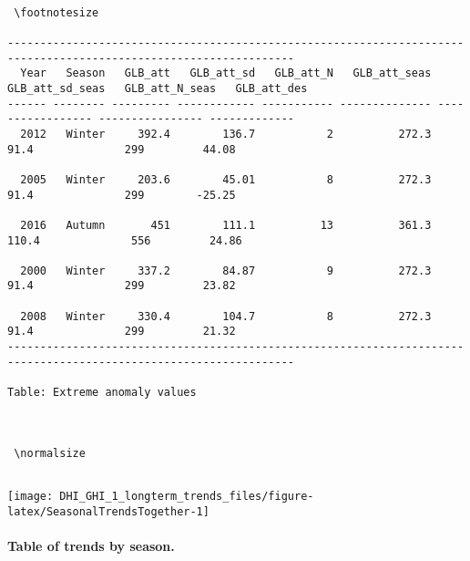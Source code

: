 \documentclass[
  10pt,
  a4paper,oneside]{article}
\begin{document}
\begin{verbatim}
 
 \footnotesize 
 
------------------------------------------------------------------------------------------------------------------
  Year   Season   GLB_att   GLB_att_sd   GLB_att_N   GLB_att_seas   GLB_att_sd_seas   GLB_att_N_seas   GLB_att_des
------ -------- --------- ------------ ----------- -------------- ----------------- ---------------- -------------
  2012   Winter     392.4        136.7           2          272.3              91.4              299         44.08

  2005   Winter     203.6        45.01           8          272.3              91.4              299        -25.25

  2016   Autumn       451        111.1          13          361.3             110.4              556         24.86

  2000   Winter     337.2        84.87           9          272.3              91.4              299         23.82

  2008   Winter     330.4        104.7           8          272.3              91.4              299         21.32
------------------------------------------------------------------------------------------------------------------

Table: Extreme anomaly values


 
 \normalsize 
 
\end{verbatim}

\begin{center}\texttt{[image: DHI\_GHI\_1\_longterm\_trends\_files/figure-latex/SeasonalTrendsTogether-1]} \end{center}

\newpage
\FloatBarrier

\hypertarget{table-of-trends-by-season.}{%
\paragraph{Table of trends by season.}\label{table-of-trends-by-season.}}
\end{document}
